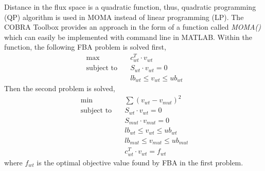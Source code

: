 Distance in the flux space is a quadratic function, thus, quadratic programming (QP) algorithm is used in MOMA instead of linear programming (LP). The COBRA Toolbox provides an approach in the form of a function called \emph{MOMA()} which can easily be implemented with command line in MATLAB. Within the function, the following FBA problem is solved first,
\begin{align}
 \ \text{max} \quad & c^T_{wt} \cdot v_{wt} \\
 \label{eq:moma_1}
 \ \text{subject to} \quad & S_{wt} \cdot v_{wt}=0 \\
 \ & lb_{wt} \leq v_{wt} \leq ub_{wt}
\end{align}
\noindent
Then the second problem is solved,
\begin{align}
 \ \text{min} \quad & \sum (v_{wt} - v_{mut})^2\\
 \label{eq:moma_2}
 \ \text{subject to} \quad & S_{wt} \cdot v_{wt}=0 \\
 \ & S_{mut} \cdot v_{mut}=0 \\
 \ & lb_{wt} \leq v_{wt} \leq ub_{wt} \\
 \ & lb_{mut} \leq v_{mut} \leq ub_{mut} \\
 \ & c^T_{wt} \cdot v_{wt} = f_{wt}
\end{align}
\noindent
where $f_{wt}$ is the optimal objective value found by FBA in the first problem.
